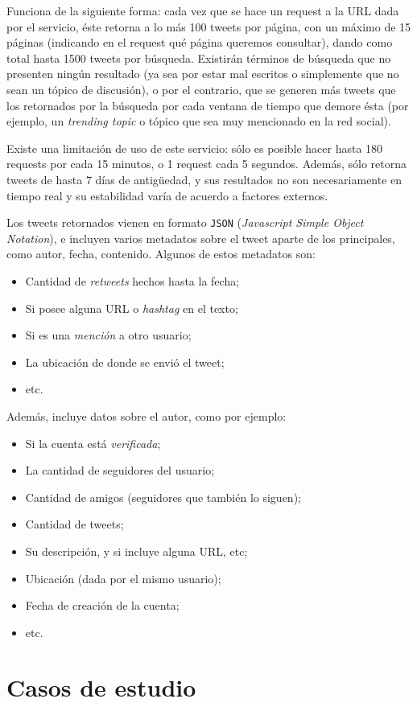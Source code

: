   Funciona de la siguiente forma: cada vez que se hace un request a la
   URL dada por el servicio, éste retorna a lo más 100 tweets por página, con un
   máximo de 15 páginas (indicando en el request qué página queremos
   consultar), dando como total hasta 1500 tweets por búsqueda. Existirán
   términos de búsqueda que no presenten ningún resultado  (ya sea por
   estar mal escritos o simplemente que no sean un tópico de discusión), o por
   el contrario, que se generen más tweets que los retornados por la
   búsqueda por cada ventana de tiempo que demore ésta (por ejemplo, un
   \emph{trending topic} o tópico que sea muy mencionado en la red social).

   Existe una limitación de uso de este servicio: sólo es posible hacer
   hasta 180 requests por cada 15 minutos, o 1 request cada 5
   segundos. Además, sólo retorna tweets de hasta 7 días de antigüedad, y
   sus resultados no son necesariamente en tiempo real y su estabilidad
   varía de acuerdo a factores externos.

   Los tweets retornados vienen en formato \texttt{JSON} (\emph{Javascript Simple Object Notation}),
   e incluyen varios metadatos sobre el tweet aparte de los principales,
   como autor, fecha, contenido. Algunos de estos metadatos son:

\begin{itemize}
\item Cantidad de \emph{retweets} hechos hasta la fecha;
\item Si posee alguna URL o \emph{hashtag} en el texto;
\item Si es una \emph{mención} a otro usuario;
\item La ubicación de donde se envió el tweet;
\item etc.
\end{itemize}
  Además, incluye datos sobre el autor, como por ejemplo:

\begin{itemize}
\item Si la cuenta está \emph{verificada};
\item La cantidad de seguidores del usuario;
\item Cantidad de amigos (seguidores que también lo siguen);
\item Cantidad de tweets;
\item Su descripción, y si incluye alguna URL, etc;
\item Ubicación (dada por el mismo usuario);
\item Fecha de creación de la cuenta;
\item etc.
\end{itemize}
\section{Casos de estudio}
\label{sec-4.4}

\label{casosest}